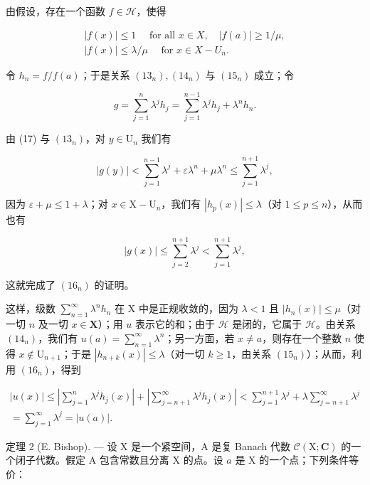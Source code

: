 由假设，存在一个函数 \(f \in \mathcal{H}\)，使得

\[
\begin{array}{l} | f (x) | \leqslant 1 \quad \text { for   all } x \in X, \quad | f (a) | \geqslant 1 / \mu , \\ | f (x) | \leqslant \lambda / \mu \quad \text { for } x \in X - U _ {n}. \end{array}
\]

令 \(h_n = f / f(a)\)；于是关系 \((13_n), (14_n)\) 与 \((15_n)\) 成立；令

\[
g = \sum_ {j = 1} ^ {n} \lambda^ {j} h _ {j} = \sum_ {j = 1} ^ {n - 1} \lambda^ {j} h _ {j} + \lambda^ {n} h _ {n}.
\]

由 (17) 与 \((13_{n})\)，对 \(y \in \mathrm{U}_n\) 我们有

\[
| g (y) | <   \sum_ {j = 1} ^ {n - 1} \lambda^ {j} + \varepsilon \lambda^ {n} + \mu \lambda^ {n} \leqslant \sum_ {j = 1} ^ {n + 1} \lambda^ {j},
\]

因为 \(\varepsilon + \mu \leqslant 1 + \lambda\)；对 \(x \in \mathrm{X} - \mathrm{U}_n\)，我们有 \(|h_p(x)| \leqslant \lambda\)（对 \(1 \leqslant p \leqslant n\)），从而也有

\[
| g (x) | \leqslant \sum_ {j = 2} ^ {n + 1} \lambda^ {j} <   \sum_ {j = 1} ^ {n + 1} \lambda^ {j},
\]

这就完成了 \((16_{n})\) 的证明。

这样，级数 \(\sum_{n=1}^{\infty} \lambda^n h_n\) 在 X 中是正规收敛的，因为 \(\lambda < 1\) 且 \(|h_n(x)| \leqslant \mu\)（对一切 \(n\) 及一切 \(x \in \mathbf{X}\)）；用 \(u\) 表示它的和；由于 \(\mathcal{H}\) 是闭的，它属于 \(\mathcal{H}\)。由关系 \((14_n)\)，我们有 \(u(a) = \sum_{n=1}^{\infty} \lambda^n\)；另一方面，若 \(x \neq a\)，则存在一个整数 \(n\) 使得 \(x \notin \mathrm{U}_{n+1}\)；于是 \(|h_{n+k}(x)| \leqslant \lambda\)（对一切 \(k \geqslant 1\)，由关系 \((15_n)\)）；从而，利用 \((16_n)\)，得到

\[
\begin{array}{l} | u (x) | \leqslant \left| \sum_ {j = 1} ^ {n} \lambda^ {j} h _ {j} (x) \right| + \left| \sum_ {j = n + 1} ^ {\infty} \lambda^ {j} h _ {j} (x) \right| <   \sum_ {j = 1} ^ {n + 1} \lambda^ {j} + \lambda \sum_ {j = n + 1} ^ {\infty} \lambda^ {j} \\ = \sum_ {j = 1} ^ {\infty} \lambda^ {j} = | u (a) |. \end{array}
\]

定理 2 (E. Bishop). --- 设 X 是一个紧空间，A 是复 Banach 代数 \(\mathcal{C}(\mathrm{X};\mathbf{C})\) 的一个闭子代数。假定 A 包含常数且分离 X 的点。设 \(a\) 是 X 的一个点；下列条件等价：

